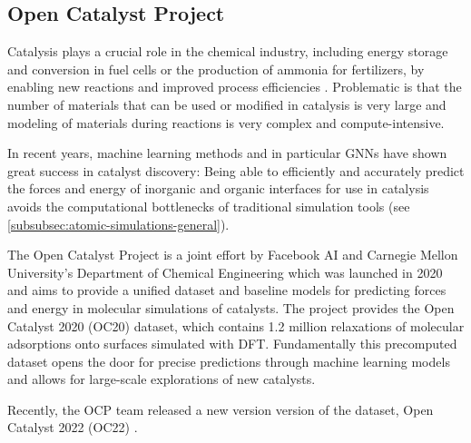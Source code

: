 \subsection{Open Catalyst Project}

Catalysis plays a crucial role in the chemical industry, including energy storage and conversion in 
fuel cells or the production of ammonia for fertilizers, by enabling new reactions and improved 
process efficiencies \cite{Chanussot_2021}. Problematic is that the number of materials that can 
be used or modified in catalysis is very large and modeling of materials during reactions is very 
complex and compute-intensive.

In recent years, machine learning methods and in particular GNNs have shown great success in 
catalyst discovery: Being able to efficiently and accurately predict the 
forces and energy of inorganic and organic interfaces for use in catalysis avoids the 
computational bottlenecks of traditional simulation tools (see \ref{subsubsec:atomic-simulations-general}). 

The Open Catalyst Project \cite*{Chanussot_2021} is a joint effort by Facebook AI and Carnegie Mellon 
University's Department of Chemical Engineering which was launched in 2020 and 
aims to provide a unified dataset and baseline models for predicting forces and energy in molecular 
simulations of catalysts. The project provides the Open Catalyst 2020 (OC20) dataset, which contains 
1.2 million relaxations of molecular adsorptions onto surfaces simulated with DFT. Fundamentally this 
precomputed dataset opens the door for precise predictions through machine learning models and allows
for large-scale explorations of new catalysts.

Recently, the OCP team released a new version version of the dataset, Open Catalyst 2022 (OC22) 
\cite{https://doi.org/10.48550/arxiv.2206.08917}.